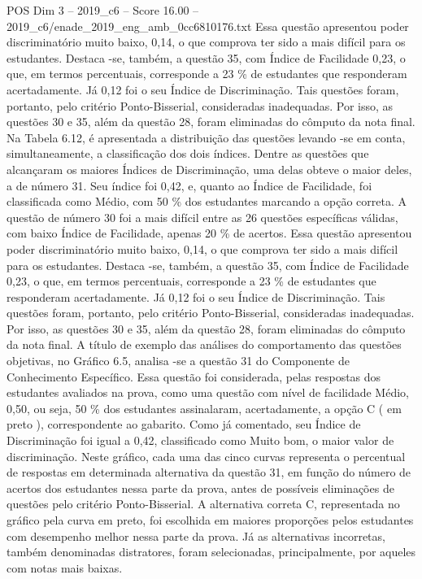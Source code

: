\begin{textsample}{POS Dim 3 – 2019\_c6 – Score 16.00 – 2019\_c6/enade\_2019\_eng\_amb\_0cc6810176.txt}
Essa questão apresentou poder discriminatório muito baixo, 0,14, o que comprova ter sido a mais difícil para os estudantes.
Destaca -se, também, a questão 35, com Índice de Facilidade 0,23, o que, em termos percentuais, corresponde a 23 \% de estudantes que responderam acertadamente.
Já 0,12 foi o seu Índice de Discriminação.
Tais questões foram, portanto, pelo critério Ponto-Bisserial, consideradas inadequadas.
Por isso, as questões 30 e 35, além da questão 28, foram eliminadas do cômputo da nota final.
Na Tabela 6.12, é apresentada a distribuição das questões levando -se em conta, simultaneamente, a classificação dos dois índices.
Dentre as questões que alcançaram os maiores Índices de Discriminação, uma delas obteve o maior deles, a de número 31.
Seu índice foi 0,42, e, quanto ao Índice de Facilidade, foi classificada como Médio, com 50 \% dos estudantes marcando a opção correta.
A questão de número 30 foi a mais difícil entre as 26 questões específicas válidas, com baixo Índice de Facilidade, apenas 20 \% de acertos.
Essa questão apresentou poder discriminatório muito baixo, 0,14, o que comprova ter sido a mais difícil para os estudantes.
Destaca -se, também, a questão 35, com Índice de Facilidade 0,23, o que, em termos percentuais, corresponde a 23 \% de estudantes que responderam acertadamente.
Já 0,12 foi o seu Índice de Discriminação.
Tais questões foram, portanto, pelo critério Ponto-Bisserial, consideradas inadequadas.
Por isso, as questões 30 e 35, além da questão 28, foram eliminadas do cômputo da nota final.
A título de exemplo das análises do comportamento das questões objetivas, no Gráfico 6.5, analisa -se a questão 31 do Componente de Conhecimento Específico.
Essa questão foi considerada, pelas respostas dos estudantes avaliados na prova, como uma questão com nível de facilidade Médio, 0,50, ou seja, 50 \% dos estudantes assinalaram, acertadamente, a opção C ( em preto ), correspondente ao gabarito.
Como já comentado, seu Índice de Discriminação foi igual a 0,42, classificado como Muito bom, o maior valor de discriminação.
Neste gráfico, cada uma das cinco curvas representa o percentual de respostas em determinada alternativa da questão 31, em função do número de acertos dos estudantes nessa parte da prova, antes de possíveis eliminações de questões pelo critério Ponto-Bisserial.
A alternativa correta C, representada no gráfico pela curva em preto, foi escolhida em maiores proporções pelos estudantes com desempenho melhor nessa parte da prova.
Já as alternativas incorretas, também denominadas distratores, foram selecionadas, principalmente, por aqueles com notas mais baixas.

\end{textsample}
